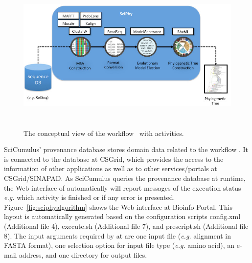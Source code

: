 \begin{figure}[!t]
\begin{center}
	\includegraphics[height=7.7cm]{imgs/sciphyworkflow.png}
	\vspace{-7px}
\caption{The conceptual view of the workflow ~\sci with activities.} \label{fig:sciphyworkflow}
\end{center}
\end{figure}

SciCumulus’ provenance database stores domain data related to the workflow \sci. It is connected to the \system database at CSGrid, which provides the access to the information of other \system applications as well as to other services/portals at CSGrid/SINAPAD. As SciCumulus queries the provenance database at runtime, the Web interface of \system automatically will report messages of the \sci execution status \textit{e.g.} which activity is finished or if any error is presented. 
Figure~\ref{fig:sciphyalgorithm} shows the \sci Web interface at Bioinfo-Portal. This layout is automatically generated based on the configuration scripts config.xml (Additional file 4), execute.sh (Additional file 7), and prescript.sh (Additional file 8). The input arguments required by \sci at \system are one input file (\textit{e.g.} alignment in FASTA format), one selection option for input file type (\textit{e.g.} amino acid), an e-mail address, and one directory for output files. 

